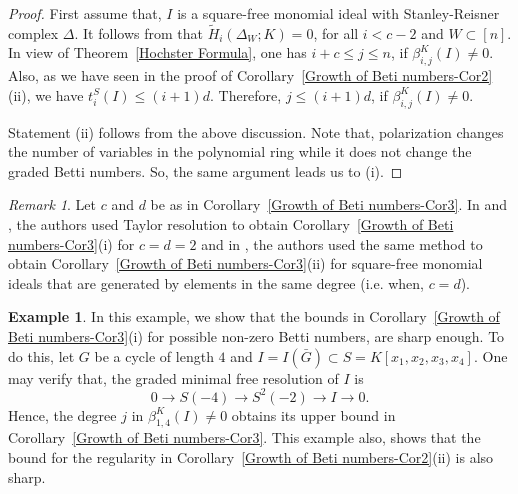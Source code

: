\documentclass[a4paper,11pt]{amsart}
\theoremstyle{plain}
\theoremstyle{definition}
\newtheorem{ex}[thm]{Example}
\theoremstyle{remark}
\newtheorem{rem}{Remark}
\begin{document}
\begin{proof}
First assume that, $I$ is a square-free monomial ideal with Stanley-Reisner complex $\Delta$. It follows from \cite[Proposition 3.1(i)]{mar2} that $\tilde{H}_i(\Delta_W; K) =0$, for all $i<c-2$ and $W \subset [n]$. In view of Theorem~\ref{Hochster Formula}, one has $i+c \leq j \leq n$, if $\beta_{i,j}^K(I) \neq 0$. Also, as we have seen in the proof of Corollary~\ref{Growth of Beti numbers-Cor2}(ii), we have $t_i^S(I) \leq (i+1)d$. Therefore, $j \leq (i+1)d$, if $\beta_{i,j}^K(I) \neq 0$.
	
Statement (ii) follows from the above discussion. Note that, polarization changes the number of variables in the polynomial ring while it does not change the graded Betti numbers. So, the same argument leads us to (i).
\end{proof}

\begin{rem} \rm
Let $c$ and $d$ be as in Corollary~\ref{Growth of Beti numbers-Cor3}. In \cite[Lemma 2.2]{Katzman} and \cite[Theorem 3.2.3]{HaVanTuyl1}, the authors used Taylor resolution to obtain Corollary~\ref{Growth of Beti numbers-Cor3}(i) for $c=d=2$ and in \cite[Theorem 2.6]{HaVanTuyl2}, the authors used the same method to obtain Corollary~\ref{Growth of Beti numbers-Cor3}(ii) for square-free monomial ideals that are generated by elements in the same degree (i.e. when, $c=d$).
\end{rem}

\begin{ex}
In this example, we show that the bounds in Corollary~\ref{Growth of Beti numbers-Cor3}(i) for possible non-zero Betti numbers, are sharp enough. To do this, let $G$ be a cycle of length $4$ and $I=I \left( \bar{G} \right) \subset S=K[x_1, x_2, x_3, x_4]$. One may verify that, the graded minimal free resolution of $I$ is
\[
0 \to S(-4) \to S^{2}(-2) \to I \to 0.
\]
Hence, the degree $j$ in $\beta_{1,4}^K(I) \neq 0$ obtains its upper bound in Corollary~\ref{Growth of Beti numbers-Cor3}. This example also, shows that the bound for the regularity in Corollary~\ref{Growth of Beti numbers-Cor2}(ii) is also sharp.
\end{ex}
\end{document}
